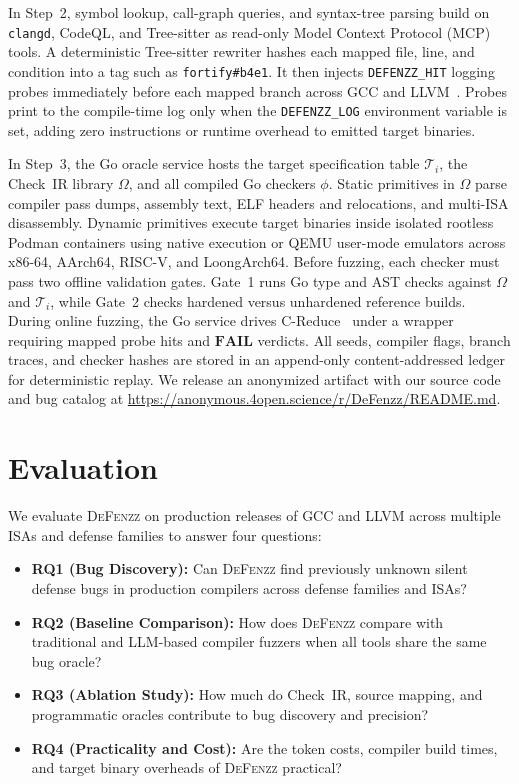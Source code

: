 \documentclass[conference,compsoc]{IEEEtran}
\begin{document}
In Step~2, symbol lookup, call-graph queries, and syntax-tree parsing build on \texttt{clangd}, CodeQL, and Tree-sitter as read-only Model Context Protocol (MCP) tools. A deterministic Tree-sitter rewriter hashes each mapped file, line, and condition into a tag such as \texttt{fortify\#b4e1}. It then injects \texttt{DEFENZZ\_HIT} logging probes immediately before each mapped branch across GCC and LLVM~\cite{lattner2004llvm}. Probes print to the compile-time log only when the \texttt{DEFENZZ\_LOG} environment variable is set, adding zero instructions or runtime overhead to emitted target binaries.

In Step~3, the Go oracle service hosts the target specification table $\mathcal{T}_i$, the Check~IR library $\Omega$, and all compiled Go checkers $\phi$. Static primitives in $\Omega$ parse compiler pass dumps, assembly text, ELF headers and relocations, and multi-ISA disassembly. Dynamic primitives execute target binaries inside isolated rootless Podman containers using native execution or QEMU user-mode emulators across x86-64, AArch64, RISC-V, and LoongArch64. Before fuzzing, each checker must pass two offline validation gates. Gate~1 runs Go type and AST checks against $\Omega$ and $\mathcal{T}_i$, while Gate~2 checks hardened versus unhardened reference builds. During online fuzzing, the Go service drives C-Reduce~\cite{creduce} under a wrapper requiring mapped probe hits and $\mathbf{FAIL}$ verdicts. All seeds, compiler flags, branch traces, and checker hashes are stored in an append-only content-addressed ledger for deterministic replay. We release an anonymized artifact with our source code and bug catalog at \url{https://anonymous.4open.science/r/DeFenzz/README.md}.

\section{Evaluation}\label{sec:eval}

We evaluate \textsc{DeFenzz} on production releases of GCC and LLVM across multiple ISAs and defense families to answer four questions:
\begin{itemize}
  \item \textbf{RQ1 (Bug Discovery):} Can \textsc{DeFenzz} find previously unknown silent defense bugs in production compilers across defense families and ISAs?
  \item \textbf{RQ2 (Baseline Comparison):} How does \textsc{DeFenzz} compare with traditional and LLM-based compiler fuzzers when all tools share the same bug oracle?
  \item \textbf{RQ3 (Ablation Study):} How much do Check~IR, source mapping, and programmatic oracles contribute to bug discovery and precision?
  \item \textbf{RQ4 (Practicality and Cost):} Are the token costs, compiler build times, and target binary overheads of \textsc{DeFenzz} practical?
\end{itemize}
\end{document}
